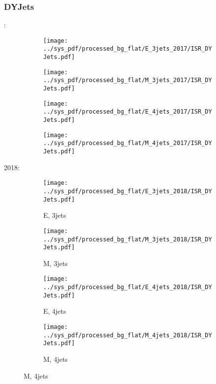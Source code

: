 \documentclass{beamer}
\begin{document}
\begin{frame}
\frametitle{DYJets}
\fontsize{5}{1}:
\begin{figure}
\centering
\begin{subfigure}[b]{0.24\textwidth}
\texttt{[image: ../sys\_pdf/processed\_bg\_flat/E\_3jets\_2017/ISR\_DYJets.pdf]}
\end{subfigure}
\begin{subfigure}[b]{0.24\textwidth}
\texttt{[image: ../sys\_pdf/processed\_bg\_flat/M\_3jets\_2017/ISR\_DYJets.pdf]}
\end{subfigure}
\begin{subfigure}[b]{0.24\textwidth}
\texttt{[image: ../sys\_pdf/processed\_bg\_flat/E\_4jets\_2017/ISR\_DYJets.pdf]}
\end{subfigure}
\begin{subfigure}[b]{0.24\textwidth}
\texttt{[image: ../sys\_pdf/processed\_bg\_flat/M\_4jets\_2017/ISR\_DYJets.pdf]}
\end{subfigure}
\end{figure}
2018:
\begin{figure}
\centering
\begin{subfigure}[b]{0.24\textwidth}
\texttt{[image: ../sys\_pdf/processed\_bg\_flat/E\_3jets\_2018/ISR\_DYJets.pdf]}
\captionsetup{font=tiny}
\caption{E, 3jets}
\end{subfigure}
\begin{subfigure}[b]{0.24\textwidth}
\texttt{[image: ../sys\_pdf/processed\_bg\_flat/M\_3jets\_2018/ISR\_DYJets.pdf]}
\captionsetup{font=tiny}
\caption{M, 3jets}
\end{subfigure}
\begin{subfigure}[b]{0.24\textwidth}
\texttt{[image: ../sys\_pdf/processed\_bg\_flat/E\_4jets\_2018/ISR\_DYJets.pdf]}
\captionsetup{font=tiny}
\caption{E, 4jets}
\end{subfigure}
\begin{subfigure}[b]{0.24\textwidth}
\texttt{[image: ../sys\_pdf/processed\_bg\_flat/M\_4jets\_2018/ISR\_DYJets.pdf]}
\captionsetup{font=tiny}
\caption{M, 4jets}
\end{subfigure}
\end{figure}
\end{frame}
\end{document}
